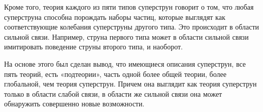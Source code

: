 Кроме того, теория каждого из пяти типов суперструн говорит о том, что любая суперструна способна порождать наборы частиц, которые выглядят как соответствующие колебания суперструны другого типа. Это происходит в области сильной связи. Например, струна первого типа может в области сильной связи имитировать поведение струны второго типа, и наоборот. 

На основе этого был сделан вывод, что имеющиеся описания суперструн, все пять теорий, есть «подтеории», часть одной более общей теории, более глобальной, чем  теория суперструн. Причем она выглядит как теория суперструн только в области слабой связи, в области же сильной связи она может обнаружить совершенно новые возможности.